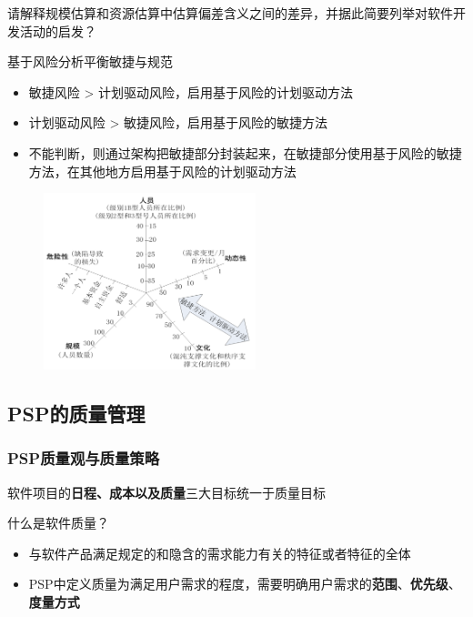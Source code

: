 \begin{problem}
请解释规模估算和资源估算中估算偏差含义之间的差异，并据此简要列举对软件开发活动的启发？

基于风险分析平衡敏捷与规范
\begin{itemize}
    \item 敏捷风险 > 计划驱动风险，启用基于风险的计划驱动方法
    \item 计划驱动风险 > 敏捷风险，启用基于风险的敏捷方法
    \item 不能判断，则通过架构把敏捷部分封装起来，在敏捷部分使用基于风险的敏捷方法，在其他地方启用基于风险的计划驱动方法
\end{itemize}

\begin{figure}[H]
    \vspace{-0.5em}
	\centering
	\includegraphics[width=0.55\textwidth]{images/基于风险分析平衡敏捷与规范.png}
    \vspace{-1em}
\end{figure}
\end{problem}

\subsection{PSP的质量管理}

\subsubsection{PSP质量观与质量策略}
软件项目的\textbf{日程、成本以及质量}三大目标统一于质量目标

什么是软件质量？
\begin{itemize}
    \item 与软件产品满足规定的和隐含的需求能力有关的特征或者特征的全体
    \item PSP中定义质量为满足用户需求的程度，需要明确用户需求的\textbf{范围}、\textbf{优先级}、\textbf{度量方式}
\end{itemize}

